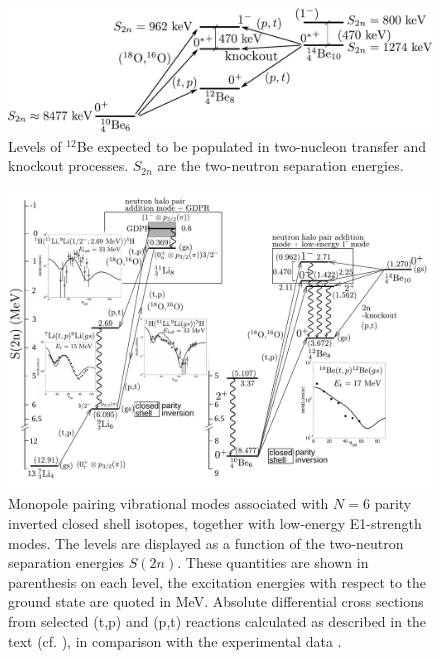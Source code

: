 \begin{subappendices}
\begin{figure}
\includegraphics[width=\textwidth]{C8/figsC8/figa4_newnew.pdf}
\caption{Levels of $^{12}$Be expected to be populated in two-nucleon transfer and knockout processes. $S_{2n}$ are the two-neutron separation energies.}\label{fig6.I.4}
\end{figure}


\begin{figure}
	\begin{center}
\includegraphics[angle=0,width=1.2\textwidth]{C8/figsC8/fig1_varenna.pdf}
\caption{ Monopole pairing vibrational modes associated with 
$N=6$ parity inverted closed shell isotopes, together with low-energy E1-strength modes. 
The levels are  displayed as a function of the two-neutron separation energies $S(2n)$. 
These quantities are shown in parenthesis on each level, the excitation energies with respect to the ground state are quoted in MeV. 
Absolute differential cross sections from selected (t,p) and (p,t) reactions calculated as described in the text (cf. \cite{Poteletal2010,Potelphysat2014}), 
in comparison with the experimental data \cite{Young1971,Fortune:94}.}\label{fig6.I.5}
\end{center}
\end{figure}


\end{subappendices}
